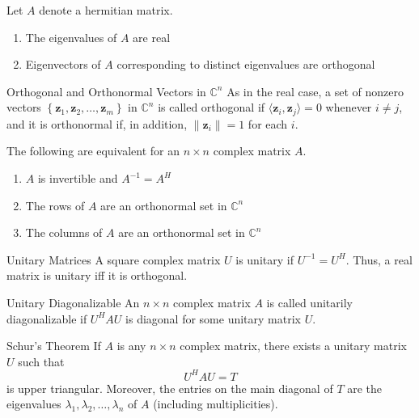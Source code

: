 \documentclass[12pt]{article}
\begin{document}
\begin{theorem}{}{}
    Let $ A $ denote a hermitian matrix.
    \begin{enumerate}[label=(\roman*)]
        \item The eigenvalues of $ A $ are real
        \item Eigenvectors of $ A $ corresponding to distinct eigenvalues are orthogonal
    \end{enumerate}
\end{theorem}

\begin{definition}{Orthogonal and Orthonormal Vectors in $ \mathbb{C}^n $}{}
    As in the real case, a set of nonzero vectors $ \left\{ \mathbf{z}_1, \mathbf{z}_2, \dots, \mathbf{z}_m \right\} $ in $ \mathbb{C}^n $ is called orthogonal if $ \langle \mathbf{z}_i, \mathbf{z}_j \rangle = 0 $ whenever $ i \neq j $, and it is orthonormal if, in addition, $ \lVert \mathbf{z}_i \rVert = 1 $ for each $ i $.
\end{definition}

\begin{theorem}{}{}
    The following are equivalent for an $ n \times n $ complex matrix $ A $.
    \begin{enumerate}[label=(\roman*)]
        \item $ A $ is invertible and $ A^{-1} = A^H $
        \item The rows of $ A $ are an orthonormal set in $ \mathbb{C}^n $
        \item The columns of $ A $ are an orthonormal set in $ \mathbb{C}^n $
    \end{enumerate}
\end{theorem}

\begin{definition}{Unitary Matrices}{}
    A square complex matrix $ U $ is unitary if $ U^{-1} = U^H $. Thus, a real matrix is unitary iff it is orthogonal.
\end{definition}

\begin{definition}{Unitary Diagonalizable}{}
    An $ n \times n $ complex matrix $ A $ is called unitarily diagonalizable if $ U^H AU $ is diagonal for some unitary matrix $ U $.
\end{definition}

\begin{theorem}{Schur's Theorem}{}
    If $ A $ is any $ n \times n $ complex matrix, there exists a unitary matrix $ U $ such that
    \[ U^H AU = T \]
    is upper triangular. Moreover, the entries on the main diagonal of $ T $ are the eigenvalues $ \lambda_1, \lambda_2, \dots, \lambda_n $ of $ A $ (including multiplicities).
\end{theorem}
\end{document}
